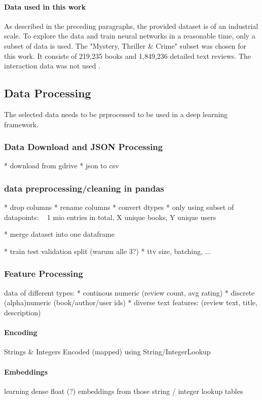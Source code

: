 \documentclass[10pt,draft,journal,a4paper,oneside,twocolumn]{IEEEtran}
\begin{document}
\paragraph{Data used in this work}
As described in the preceding paragraphs, the provided dataset is of an industrial scale. To explore the data and train neural networks in a reasonable time, only a subset of data is used.
The "Mystery, Thriller \& Crime" subset was chosen for this work. It consists of 219,235 books and 1,849,236 detailed text reviews. The interaction data was not used .

\subsection{Data Processing}
The selected data needs to be prprocessed to be used in a deep learning framework.

\subsubsection{Data Download and JSON Processing}
* download from gdrive
* json to csv

\subsubsection{data preprocessing/cleaning in pandas}
* drop columns
* rename columns
* convert dtypes
* only using subset of datapoints: ~ 1 mio entries in total, X unique books, Y unique users

* merge dataset into one dataframe

* train test validation split (warum alle 3?)
* ttv size, batching, ...

\subsubsection{Feature Processing}
data of different types:
* continous numeric (review count, avg rating)
* discrete (alpha)numeric (book/author/user ids)
* diverse text features: (review text, title, description)

\paragraph{Encoding}
Strings \& Integers Encoded (mapped) using String/IntegerLookup 
\paragraph{Embeddings}
learning dense float (?) embeddings from those string / integer lookup tables
\end{document}
